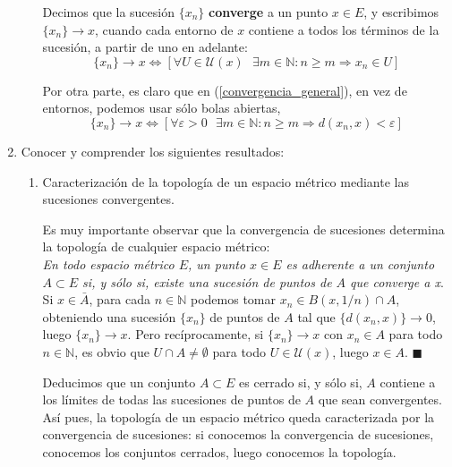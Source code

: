 \documentclass[a4paper, 12pt]{article}
\begin{document}
\begin{enumerate}[label=\textbf{\arabic*}.]
\begin{enumerate}[label=\textit{\alph*})]
Decimos que la sucesión \(\{x_n\}\) \textbf{converge} a un punto \(x \in E\), y escribimos \(\{x_n\} \rightarrow x\), cuando cada entorno de \(x\) contiene a todos los términos de la sucesión, a partir de uno en adelante:
\begin{equation} \label{convergencia_general}
	\{x_n\} \rightarrow x \Longleftrightarrow \left[ \forall U \in \mathcal{U}(x) \text{ } \exists m \in \mathbb{N} : n \geq m \Rightarrow x_n \in U \right]
\end{equation}

Por otra parte, es claro que en (\ref{convergencia_general}), en vez de entornos, podemos usar sólo bolas abiertas,
\begin{equation}\label{convergencia_bolas}
	\{x_n\} \rightarrow x \Longleftrightarrow \left[ \forall \varepsilon > 0 \text{ } \exists m \in \mathbb{N} : n \geq m \Rightarrow d(x_n, x) < \varepsilon \right]
\end{equation}
	\end{enumerate}
	
\bigskip

	\item Conocer y comprender los siguientes resultados:
	
	\begin{enumerate}[label=\textit{\alph*})]
		\item Caracterización de la topología de un espacio métrico mediante las sucesiones convergentes.
		
Es muy importante observar que la convergencia de sucesiones determina la topología de cualquier espacio métrico: \\

\hspace{1cm} \textit{En todo espacio métrico \(E\), un punto \(x \in E\) es adherente a un conjunto \(A \subset E\) si, y sólo si, existe una sucesión de puntos de \(A\) que converge a x}. \\

Si \(x \in \bar{A}\), para cada \(n \in \mathbb{N}\) podemos tomar \(x_n \in B(x, 1/n) \cap A\), obteniendo una sucesión \(\{x_n\}\) de puntos de \(A\) tal que \(\{d(x_n, x)\} \rightarrow 0\), luego \(\{x_n\} \rightarrow x\). Pero recíprocamente, si \(\{x_n\} \rightarrow x\) con \(x_n \in A\) para todo \(n \in \mathbb{N}\), es obvio que \(U \cap A \neq \emptyset\) para todo \(U \in \mathcal{U}(x)\), luego \(x \in A\). \hspace{10.5cm} \(\blacksquare\)

Deducimos que un conjunto \(A \subset E\) es cerrado si, y sólo si, \(A\) contiene a los límites de todas las sucesiones de puntos de \(A\) que sean convergentes. Así pues, la topología de un espacio métrico queda caracterizada por la convergencia de sucesiones: si conocemos la convergencia de sucesiones, conocemos los conjuntos cerrados, luego conocemos la topología.


\end{enumerate}
\end{enumerate}
\end{document}

